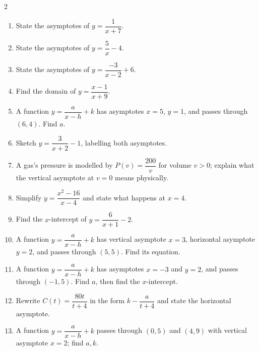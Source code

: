 \documentclass[11pt]{article}
\begin{document}
\begin{recapbox}
\begin{multicols}{2}
\small
\begin{enumerate}[leftmargin=*,itemsep=3pt]
  \item State the asymptotes of $y=\dfrac{1}{x+7}$.
  \item State the asymptotes of $y=\dfrac{5}{x}-4$.
  \item State the asymptotes of $y=\dfrac{-3}{x-2}+6$.
  \item Find the domain of $y=\dfrac{x-1}{x+9}$.
  \item A function $y=\dfrac{a}{x-h}+k$ has asymptotes $x=5$, $y=1$, and passes through $(6,4)$. Find $a$.
  \item Sketch $y=\dfrac{3}{x+2}-1$, labelling both asymptotes.
  \item A gas's pressure is modelled by $P(v)=\dfrac{200}{v}$ for volume $v>0$; explain what the vertical asymptote at $v=0$ means physically.
  \item Simplify $y=\dfrac{x^2-16}{x-4}$ and state what happens at $x=4$.
  \item Find the $x$-intercept of $y=\dfrac{6}{x+1}-2$.
  \item A function $y=\dfrac{a}{x-h}+k$ has vertical asymptote $x=3$, horizontal asymptote $y=2$, and passes through $(5,5)$. Find its equation.
  \item A function $y=\dfrac{a}{x-h}+k$ has asymptotes $x=-3$ and $y=2$, and passes through $(-1,5)$. Find $a$, then find the $x$-intercept.
  \item Rewrite $C(t)=\dfrac{80t}{t+4}$ in the form $k-\dfrac a{t+4}$ and state the horizontal asymptote.
  \item A function $y=\dfrac{a}{x-h}+k$ passes through $(0,5)$ and $(4,9)$ with vertical asymptote $x=2$; find $a,k$.
\end{enumerate}
\end{multicols}
\end{recapbox}
\end{document}
